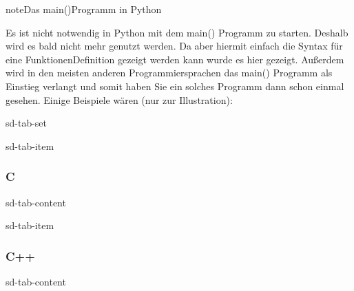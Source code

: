 \documentclass[letterpaper,10pt,english]{jupyterBook}
\begin{document}
\begin{sphinxadmonition}{note}{Das main()\sphinxhyphen{}Programm in Python}

\sphinxAtStartPar
Es ist nicht notwendig in Python mit dem main() Programm zu starten. Deshalb wird es bald nicht mehr genutzt werden. Da aber hiermit einfach die Syntax für eine Funktionen\sphinxhyphen{}Definition gezeigt werden kann wurde es hier gezeigt. Außerdem wird in den meisten anderen Programmiersprachen das main() Programm als Einstieg verlangt und somit haben Sie ein solches Programm dann schon einmal gesehen. Einige Beispiele wären (nur zur Illustration):

\begin{sphinxuseclass}{sd-tab-set}
\begin{sphinxuseclass}{sd-tab-item}\subsubsection*{C}

\begin{sphinxuseclass}{sd-tab-content}
\begin{sphinxVerbatim}[commandchars=\\\{\}]

\end{sphinxVerbatim}

\end{sphinxuseclass}
\end{sphinxuseclass}
\begin{sphinxuseclass}{sd-tab-item}\subsubsection*{C++}

\begin{sphinxuseclass}{sd-tab-content}
\begin{sphinxVerbatim}[commandchars=\\\{\}]

\end{sphinxVerbatim}


\end{sphinxuseclass}
\end{sphinxuseclass}
\end{sphinxuseclass}
\end{sphinxadmonition}
\end{document}
